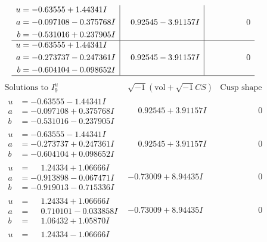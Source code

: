 \documentclass[1p]{elsarticle_modified}
\theoremstyle{definition}
\newcommand{\I}{\sqrt{-1}}
\begin{document}
$$\begin{array}{c|c|c}
\begin{aligned}
u &= -0.63555 + 1.44341 I \\
a &= -0.097108 - 0.375768 I \\
b &= -0.531016 + 0.237905 I\end{aligned}
 & \phantom{-}0.92545 - 3.91157 I & \phantom{-0.000000 } 0 \\ \hline\begin{aligned}
u &= -0.63555 + 1.44341 I \\
a &= -0.273737 - 0.247361 I \\
b &= -0.604104 - 0.098652 I\end{aligned}
 & \phantom{-}0.92545 - 3.91157 I & \phantom{-0.000000 } 0\\
 \hline 
 \end{array}$$\newpage$$\begin{array}{c|c|c}  
\text{Solutions to }I^u_{9}& \I (\text{vol} + \sqrt{-1}CS) & \text{Cusp shape}\\
 \hline 
\begin{aligned}
u &= -0.63555 - 1.44341 I \\
a &= -0.097108 + 0.375768 I \\
b &= -0.531016 - 0.237905 I\end{aligned}
 & \phantom{-}0.92545 + 3.91157 I & \phantom{-0.000000 } 0 \\ \hline\begin{aligned}
u &= -0.63555 - 1.44341 I \\
a &= -0.273737 + 0.247361 I \\
b &= -0.604104 + 0.098652 I\end{aligned}
 & \phantom{-}0.92545 + 3.91157 I & \phantom{-0.000000 } 0 \\ \hline\begin{aligned}
u &= \phantom{-}1.24334 + 1.06666 I \\
a &= -0.913898 - 0.067471 I \\
b &= -0.919013 - 0.715336 I\end{aligned}
 & -0.73009 + 8.94435 I & \phantom{-0.000000 } 0 \\ \hline\begin{aligned}
u &= \phantom{-}1.24334 + 1.06666 I \\
a &= \phantom{-}0.710101 - 0.033858 I \\
b &= \phantom{-}1.06432 + 1.05870 I\end{aligned}
 & -0.73009 + 8.94435 I & \phantom{-0.000000 } 0 \\ \hline\begin{aligned}
u &= \phantom{-}1.24334 - 1.06666 I \\

\end{aligned}
\end{array}$$
\end{document}
